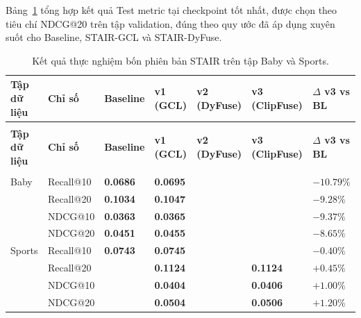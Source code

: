 \begin{longtable}
Bảng~\ref{tab:stair_v3_results} tổng hợp kết quả Test metric tại checkpoint tốt nhất, được chọn theo tiêu chí NDCG@20 trên tập validation, đúng theo quy ước đã áp dụng xuyên suốt cho Baseline, STAIR-GCL và STAIR-DyFuse.
 
\renewcommand{\arraystretch}{1.15}
\begin{longtable}{%
    >{\raggedright\arraybackslash}p{1.8cm}
    >{\centering\arraybackslash}p{1.8cm}
    >{\centering\arraybackslash}p{2.1cm}
    >{\centering\arraybackslash}p{2.0cm}
    >{\centering\arraybackslash}p{2.0cm}
    >{\centering\arraybackslash}p{2.0cm}
    >{\centering\arraybackslash}p{2.2cm}}
 
    \caption{Kết quả thực nghiệm bốn phiên bản STAIR trên tập Baby và Sports.}
    \label{tab:stair_v3_results} \\
    \hline
    \rowcolor{gray!15}\textbf{Tập dữ liệu} & \textbf{Chỉ số} & \textbf{Baseline} & \textbf{v1 (GCL)} & \textbf{v2 (DyFuse)} & \textbf{v3 (ClipFuse)} & \textbf{$\Delta$ v3 vs BL} \\
    \hline
    \endfirsthead
    \multicolumn{7}{c}{{\bfseries Bảng \thetable\ (tiếp theo)}} \\
    \hline
    \rowcolor{gray!15}\textbf{Tập dữ liệu} & \textbf{Chỉ số} & \textbf{Baseline} & \textbf{v1 (GCL)} & \textbf{v2 (DyFuse)} & \textbf{v3 (ClipFuse)} & \textbf{$\Delta$ v3 vs BL} \\
    \hline
    \endhead
    \midrule
    \multicolumn{7}{r}{\textit{Tiếp tục ở trang sau...}} \\
    \endfoot
    \hline
    \endlastfoot
 
    Baby & Recall@10 & \textbf{0.0686} & \textbf{0.0695} & 0.0578 & 0.0612 & $-10.79\%$ \\
    \midrule
    & Recall@20 & \textbf{0.1034} & \textbf{0.1047} & 0.0898 & 0.0938 & $-9.28\%$ \\
    \midrule
    & NDCG@10   & \textbf{0.0363} & \textbf{0.0365} & 0.0309 & 0.0329 & $-9.37\%$ \\
    \midrule
    & NDCG@20   & \textbf{0.0451} & \textbf{0.0455} & 0.0388 & 0.0412 & $-8.65\%$ \\
    \hline
    Sports & Recall@10 & \textbf{0.0743} & \textbf{0.0745} & 0.0669 & 0.0740 & $-0.40\%$ \\
    \midrule
    & Recall@20 & 0.1119 & \textbf{0.1124} & 0.1002 & \textbf{0.1124} & $+0.45\%$ \\
    \midrule
    & NDCG@10   & 0.0402 & \textbf{0.0404} & 0.0366 & \textbf{0.0406} & $+1.00\%$ \\
    \midrule
    & NDCG@20   & 0.0500 & \textbf{0.0504} & 0.0449 & \textbf{0.0506} & $+1.20\%$ \\
    \hline
\end{longtable}
 

\end{longtable}
